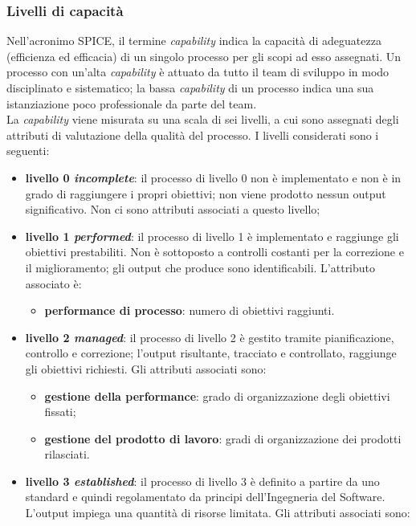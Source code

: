 \subsubsection{Livelli di capacità}
Nell'acronimo SPICE, il termine \textit{capability} indica la capacità di adeguatezza (efficienza ed efficacia) di un singolo processo per gli scopi ad esso assegnati. Un processo con un'alta \textit{capability} è attuato
da tutto il team di sviluppo in modo disciplinato e sistematico; la bassa \textit{capability} di un
processo indica una sua istanziazione poco professionale da parte del team.\\
La \textit{capability} viene misurata su una scala di sei livelli, a cui sono assegnati degli attributi di valutazione della qualità del processo. I livelli considerati sono i seguenti:
\begin{itemize}
\item \textbf{livello 0 \textit{incomplete}}: il processo di livello 0 non è implementato e non è in grado di raggiungere i propri obiettivi; non viene prodotto nessun output significativo. Non ci sono attributi associati a questo livello;
\item \textbf{livello 1 \textit{performed}}: il processo di livello 1 è implementato e raggiunge gli obiettivi prestabiliti. Non è sottoposto a controlli costanti per la correzione e il miglioramento; gli output che produce sono identificabili. L'attributo associato è:
	\begin{itemize}
	\item \textbf{performance di processo}: numero di obiettivi raggiunti.
	\end{itemize}
\item \textbf{livello 2 \textit{managed}}: il processo di livello 2 è gestito tramite pianificazione, controllo e correzione; l'output risultante, tracciato e controllato, raggiunge gli obiettivi richiesti. Gli attributi associati sono:
	\begin{itemize}
	\item \textbf{gestione della performance}: grado di organizzazione degli obiettivi fissati;
	\item \textbf{gestione del prodotto di lavoro}: gradi di organizzazione dei prodotti rilasciati.
	\end{itemize}
\item \textbf{livello 3 \textit{established}}: il processo di livello 3 è definito a partire da uno standard e quindi regolamentato da principi dell'Ingegneria del Software. L'output impiega una quantità di risorse limitata. Gli attributi associati sono:

\end{itemize}

